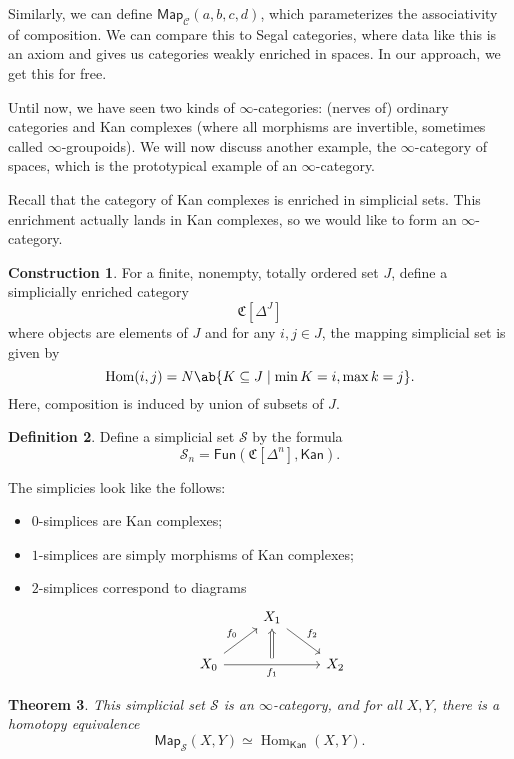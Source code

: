 \documentclass[10pt]{amsart}
\newtheorem{thm}{Theorem}[subsection]
\theoremstyle{definition}
\newtheorem{defn}[thm]{Definition}
\newtheorem{con}[thm]{Construction}
\theoremstyle{remark}
\theoremstyle{plain}
\theoremstyle{definition}
\theoremstyle{remark}
\newcommand{\mc}[1]{\mathcal{#1}}
\newcommand{\mf}[1]{\mathfrak{#1}}
\newcommand{\ms}[1]{\mathsf{#1}}
\newcommand{\1}{\mathbf{1}}
\newcommand{\2}{\mathbf{2}}
\newcommand{\3}{\mathbf{3}}
\DeclareMathOperator{\Hom}{Hom}
\begin{document}
Similarly, we can define $\ms{Map}_{\mc{C}}(a,b,c,d)$, which parameterizes the associativity of composition. We can compare this to Segal categories, where data like this is an axiom and gives us categories weakly enriched in spaces. In our approach, we get this for free.

Until now, we have seen two kinds of $\infty$-categories: (nerves of) ordinary categories and Kan complexes (where all morphisms are invertible, sometimes called $\infty$-groupoids). We will now discuss another example, the $\infty$-category of spaces, which is the prototypical example of an $\infty$-category.

Recall that the category of Kan complexes is enriched in simplicial sets. This enrichment actually lands in Kan complexes, so we would like to form an $\infty$-category.
\begin{con}
    For a finite, nonempty, totally ordered set $J$, define a simplicially enriched category
    \[ \mf{C}[\Delta^J] \]
    where objects are elements of $J$ and for any $i,j \in J$, the mapping simplicial set is given by
    \[ \Hom(i,j) = N \ab\{K \subseteq J \mid \min K = i, \max k = j\}. \]
    Here, composition is induced by union of subsets of $J$.
\end{con}

\begin{defn}
    Define a simplicial set $\mc{S}$ by the formula
    \[ \mc{S}_n = \ms{Fun}(\mf{C}[\Delta^n], \ms{Kan}). \]
\end{defn}

The simplicies look like the follows:
\begin{itemize}
    \item $0$-simplices are Kan complexes;
    \item $1$-simplices are simply morphisms of Kan complexes;
    \item $2$-simplices correspond to diagrams
    \begin{equation*}
    \begin{tikzcd}
        & |[alias=B]|X_1 \ar{dr}{f_2} & \\
        X_0 \ar{ur}{f_0} \arrow[rr,"f_1"{swap}, ""{name=U}] \arrow[Rightarrow, from=U, to=B] & & X_2
    \end{tikzcd}
    \end{equation*}
\end{itemize}

\begin{thm}
    This simplicial set $\mc{S}$ is an $\infty$-category, and for all $X, Y$, there is a homotopy equivalence
    \[ \ms{Map}_{\mc{S}}(X, Y) \simeq \Hom_{\ms{Kan}}(X, Y). \]
\end{thm}
\end{document}
